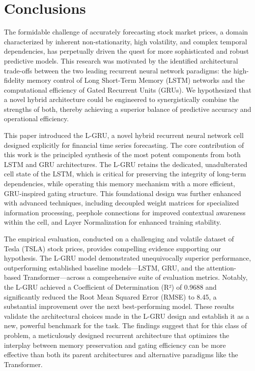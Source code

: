 \documentclass{cys}
\begin{document}
\section{Conclusions}\label{sec:conclusion}
The formidable challenge of accurately forecasting stock market prices, a domain characterized by inherent non-stationarity, high volatility, and complex temporal dependencies, has perpetually driven the quest for more sophisticated and robust predictive models. This research was motivated by the identified architectural trade-offs between the two leading recurrent neural network paradigms: the high-fidelity memory control of Long Short-Term Memory (LSTM) networks and the computational efficiency of Gated Recurrent Units (GRUs). We hypothesized that a novel hybrid architecture could be engineered to synergistically combine the strengths of both, thereby achieving a superior balance of predictive accuracy and operational efficiency.

This paper introduced the L-GRU, a novel hybrid recurrent neural network cell designed explicitly for financial time series forecasting. The core contribution of this work is the principled synthesis of the most potent components from both LSTM and GRU architectures. The L-GRU retains the dedicated, unadulterated cell state of the LSTM, which is critical for preserving the integrity of long-term dependencies, while operating this memory mechanism with a more efficient, GRU-inspired gating structure. This foundational design was further enhanced with advanced techniques, including decoupled weight matrices for specialized information processing, peephole connections for improved contextual awareness within the cell, and Layer Normalization for enhanced training stability.

The empirical evaluation, conducted on a challenging and volatile dataset of Tesla (TSLA) stock prices, provides compelling evidence supporting our hypothesis. The L-GRU model demonstrated unequivocally superior performance, outperforming established baseline models—LSTM, GRU, and the attention-based Transformer—across a comprehensive suite of evaluation metrics. Notably, the L-GRU achieved a Coefficient of Determination (R²) of 0.9688 and significantly reduced the Root Mean Squared Error (RMSE) to 8.45, a substantial improvement over the next best-performing model. These results validate the architectural choices made in the L-GRU design and establish it as a new, powerful benchmark for the task. The findings suggest that for this class of problem, a meticulously designed recurrent architecture that optimizes the interplay between memory preservation and gating efficiency can be more effective than both its parent architectures and alternative paradigms like the Transformer.
\end{document}
